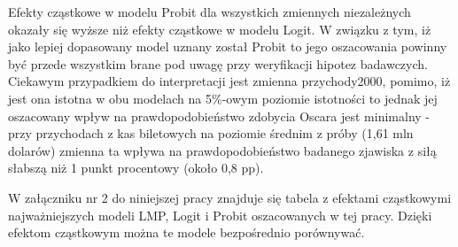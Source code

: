 Efekty cząstkowe w modelu Probit dla wszystkich zmiennych niezależnych okazały się wyższe niż efekty cząstkowe w modelu Logit. W związku z tym, iż jako lepiej dopasowany model uznany został Probit to jego oszacowania powinny być przede wszystkim brane pod uwagę przy weryfikacji hipotez badawczych. Ciekawym przypadkiem do interpretacji jest zmienna przychody2000, pomimo, iż jest ona istotna w obu modelach na 5\%-owym poziomie istotności to jednak jej oszacowany wpływ na prawdopodobieństwo zdobycia Oscara jest minimalny - przy przychodach z kas biletowych na poziomie średnim z próby (1,61 mln dolarów) zmienna ta wpływa na prawdopodobieństwo badanego zjawiska z siłą słabszą niż 1 punkt procentowy (około 0,8 pp). 

W załączniku nr 2 do niniejszej pracy znajduje się tabela z efektami cząstkowymi najważniejszych modeli LMP, Logit i Probit oszacowanych w tej pracy. Dzięki efektom cząstkowym można te modele bezpośrednio porównywać. 





